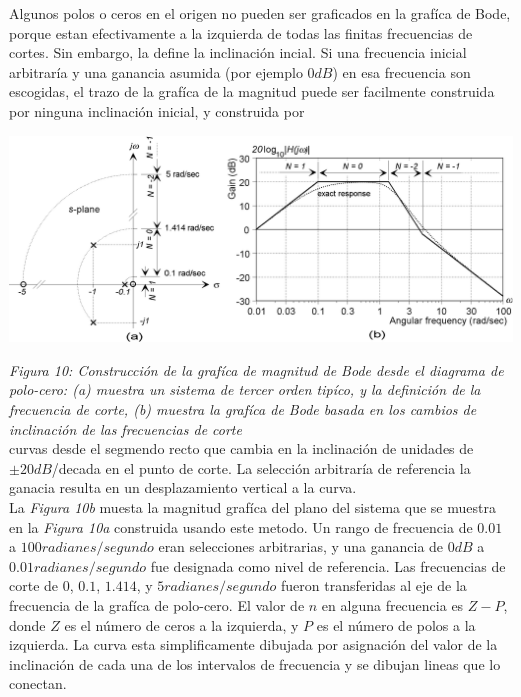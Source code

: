 \documentclass[10pt,a4paper]{article}
\begin{document}
Algunos polos o ceros en el origen no pueden ser graficados en la grafíca de Bode, porque estan efectivamente a la izquierda de todas las finitas frecuencias de cortes. Sin embargo, la define la inclinación incial. Si una frecuencia inicial arbitraría y una ganancia asumida (por ejemplo $0dB$) en esa frecuencia son escogidas, el trazo de la grafíca de la magnitud puede ser facilmente construida por ninguna inclinación inicial, y construida por
\begin{center}
  \includegraphics[scale=0.25]{img/figura10.png}
\end{center}
\textit{Figura 10: Construcción de la grafíca de magnitud de Bode desde el diagrama de polo-cero: (a) muestra un sistema de tercer orden tipíco, y la definición de la frecuencia de corte, (b) muestra la grafíca de Bode basada en los cambios de inclinación de las frecuencias de corte}\\
\vspace{0.25cm}
curvas desde el segmendo recto que cambia en la inclinación de unidades de $\pm20dB$/decada en el punto de corte. La selección arbitraría de referencia la ganacia resulta en un desplazamiento vertical a la curva.\\
La \textit{Figura 10b} muesta la magnitud grafíca del plano del sistema que se muestra en la \textit{Figura 10a} construida usando este metodo. Un rango de frecuencia de $0.01$ a $100 radianes/segundo$ eran selecciones arbitrarias, y una ganancia de $0dB$ a $0.01 radianes/segundo$ fue designada como nivel de referencia. Las frecuencias de corte de $0$, $0.1$, $1.414$, y $5 radianes/segundo$ fueron transferidas al eje de la frecuencia de la grafíca de polo-cero. El valor de $n$ en alguna frecuencia es $Z-P$, donde $Z$ es el número de ceros a la izquierda, y $P$ es el número de polos a la izquierda. La curva esta simplificamente dibujada por asignación del valor de la inclinación de cada una de los intervalos de frecuencia y se dibujan lineas que lo conectan.
\end{document}
